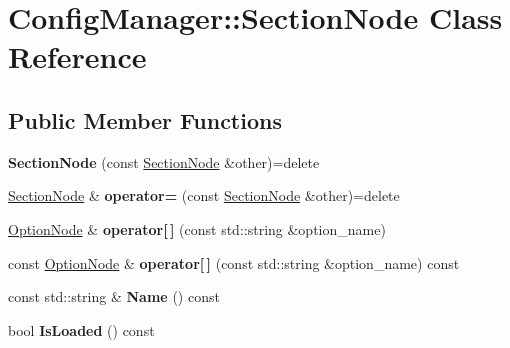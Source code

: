 \hypertarget{class_config_manager_1_1_section_node}{}\section{Config\+Manager\+:\+:Section\+Node Class Reference}
\label{class_config_manager_1_1_section_node}
\subsection*{Public Member Functions}
\begin{DoxyCompactItemize}
\item 
{\bfseries Section\+Node} (const \hyperlink{class_config_manager_1_1_section_node}{Section\+Node} \&other)=delete\hypertarget{class_config_manager_1_1_section_node_a29c0bba247577ba6d163c07d54dcbe17}{}\label{class_config_manager_1_1_section_node_a29c0bba247577ba6d163c07d54dcbe17}

\item 
\hyperlink{class_config_manager_1_1_section_node}{Section\+Node} \& {\bfseries operator=} (const \hyperlink{class_config_manager_1_1_section_node}{Section\+Node} \&other)=delete\hypertarget{class_config_manager_1_1_section_node_ab4b00644db1b2b7fda5f7c3a331280be}{}\label{class_config_manager_1_1_section_node_ab4b00644db1b2b7fda5f7c3a331280be}

\item 
\hyperlink{class_config_manager_1_1_option_node}{Option\+Node} \& {\bfseries operator\mbox{[}$\,$\mbox{]}} (const std\+::string \&option\+\_\+name)\hypertarget{class_config_manager_1_1_section_node_a8516cbcb01048e0509f4cee76555aa43}{}\label{class_config_manager_1_1_section_node_a8516cbcb01048e0509f4cee76555aa43}

\item 
const \hyperlink{class_config_manager_1_1_option_node}{Option\+Node} \& {\bfseries operator\mbox{[}$\,$\mbox{]}} (const std\+::string \&option\+\_\+name) const \hypertarget{class_config_manager_1_1_section_node_a4ccb40813d717b21708254ace493cc26}{}\label{class_config_manager_1_1_section_node_a4ccb40813d717b21708254ace493cc26}

\item 
const std\+::string \& {\bfseries Name} () const \hypertarget{class_config_manager_1_1_section_node_ad8bec497af34b75f26128136a0342699}{}\label{class_config_manager_1_1_section_node_ad8bec497af34b75f26128136a0342699}

\item 
bool {\bfseries Is\+Loaded} () const \hypertarget{class_config_manager_1_1_section_node_ac557fc56f6d2cca4919949795c34abde}{}\label{class_config_manager_1_1_section_node_ac557fc56f6d2cca4919949795c34abde}

\end{DoxyCompactItemize}


